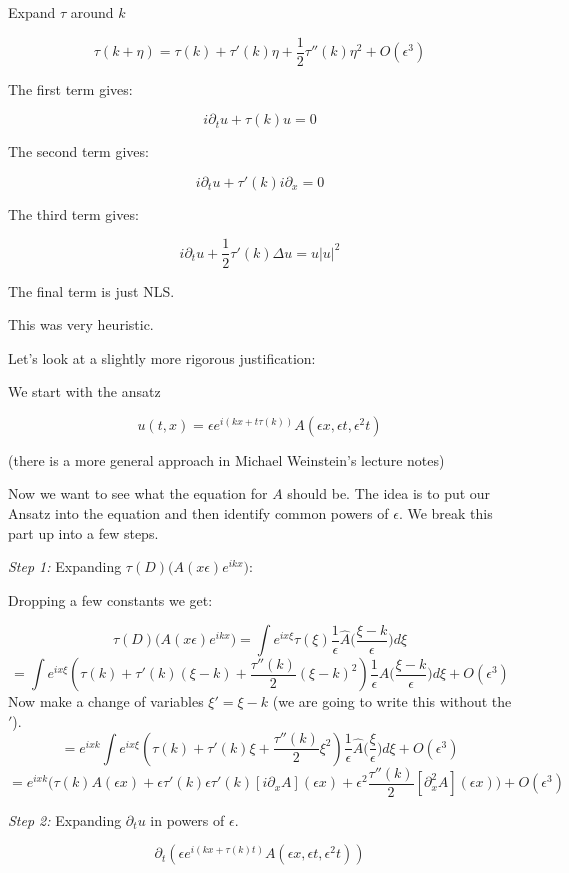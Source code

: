 \documentclass[11pt]{amsart}
\theoremstyle{plain}
\numberwithin{equation}{section}
\theoremstyle{remark}
\begin{document}
Expand $\tau$ around $k$

$$\tau(k+\eta)=\tau(k)+ \tau'(k)\eta + \frac{1}{2}\tau''(k)\eta^2 + O(\epsilon^3)$$

The first term gives:

$$i\partial_t u + \tau(k)u=0$$

The second term gives:

$$i\partial_t u + \tau'(k)i\partial_x=0$$

The third term gives:

$$i\partial_{t} u +\frac{1}{2}\tau'(k) \Delta u= u|u|^2$$

The final term is just NLS. 

This was very heuristic. 

Let's look at a slightly more rigorous justification:

We start with the ansatz

$$u(t,x)=\epsilon e^{i (kx +t \tau(k))} A(\epsilon x, \epsilon t, \epsilon^2 t)$$

(there is a more general approach in Michael Weinstein's lecture notes)

Now we want to see what the equation for $A$ should be. The idea is to put our Ansatz into the equation and then identify common powers of $\epsilon.$ We break this part up into a few steps. 

\emph{Step 1:} Expanding $\tau(D) \big ( A({x\epsilon})e^{ikx} \big ):$

Dropping a few constants we get:

$$\tau(D) \big ( A({x\epsilon})e^{ikx} \big ) = \int e^{ix\xi} \tau(\xi) \frac{1}{\epsilon} \hat{A} \big ( \frac{\xi-k}{\epsilon} \big )d\xi $$
$$= \int e^{ix\xi} (\tau(k) +\tau'(k) (\xi-k) + \frac{\tau''(k)}{2} (\xi-k)^2)\frac{1}{\epsilon} \hat{A} \big ( \frac{\xi-k}{\epsilon} \big )d\xi + O(\epsilon^3)$$
Now make a change of variables $\xi'=\xi-k$ (we are going to write this without the $'$).
$$ =e^{ixk}\int e^{ix\xi} (\tau(k) +\tau'(k) \xi + \frac{\tau''(k)}{2} \xi^2)\frac{1}{\epsilon} \hat{A} \big ( \frac{\xi}{\epsilon} \big )d\xi + O(\epsilon^3)$$ 
$$= e^{ixk} \big  ( \tau(k)A(\epsilon x) + \epsilon \tau'(k) \epsilon \tau'(k)[i\partial_{x} A] (\epsilon x) + \epsilon^2 \frac{\tau''(k)}{2} [\partial_{x}^2 A] (\epsilon x)   \big )+ O(\epsilon^3)$$

\emph{Step 2:} Expanding $\partial_{t} u$ in powers of $\epsilon.$

$$\partial_{t} (\epsilon e^{i(kx+\tau(k)t)} A(\epsilon x, \epsilon t, \epsilon^2 t))$$
\end{document}
